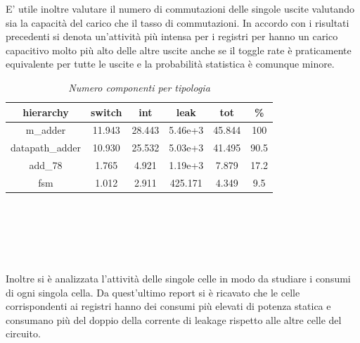 E’ utile inoltre valutare il numero di commutazioni delle singole uscite valutando sia la capacità del carico che il tasso di commutazioni. In accordo con i risultati precedenti si denota un’attività più intensa per i registri per hanno un carico capacitivo molto più alto delle altre uscite anche se il toggle rate è praticamente equivalente per tutte le uscite e la probabilità statistica è comunque minore. 
\\
\begin{table}[!h]\footnotesize
	\centering
	\begin{tabular}{|c|c|c|c|c|c|}
		\hline
		\textbf{hierarchy} & \textbf{switch} & \textbf{int} & \textbf{leak}& \textbf{tot}& \textbf{\%}\\
		\hline
		m\_adder & 11.943 & 28.443 & 5.46e+3 & 45.844 & 100\\
		\hline
		datapath\_adder & 10.930 & 25.532 & 5.03e+3 & 41.495 & 90.5\\
		\hline
		add\_78 & 1.765 & 4.921  & 1.19e+3 & 7.879 & 17.2\\
		\hline
		fsm & 1.012 & 2.911 & 425.171 & 4.349 & 9.5\\
		\hline
	\end{tabular}
	\caption{\textit{Numero componenti per tipologia}}
\label{potcell}
\end{table} \\
\\
\\
\\
\\
Inoltre si è  analizzata l’attività delle singole celle in modo da studiare i consumi di ogni singola cella. Da quest’ultimo report si è ricavato che le celle corrispondenti ai registri hanno dei consumi più elevati di potenza statica e consumano più del doppio della corrente di leakage rispetto alle altre celle del circuito.
